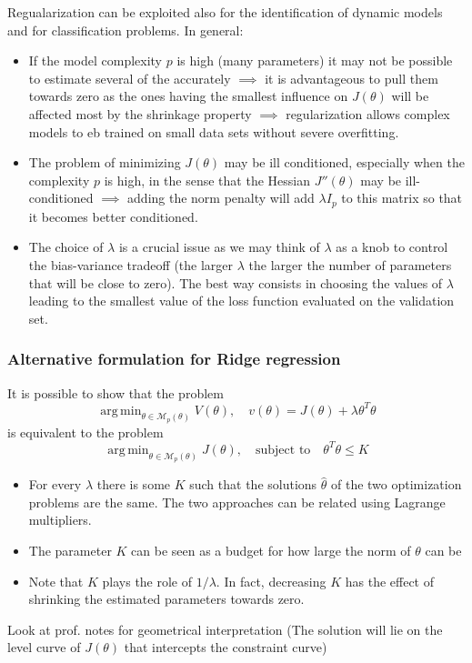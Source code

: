 \documentclass{book}
\DeclareMathOperator*{\argmin}{arg\,min}
\begin{document}
Regualarization can be exploited also for the identification of dynamic models and for classification problems. In general: 
\begin{itemize}
    \item If the model complexity $p$ is high (many parameters) it may not be possible to estimate several of the accurately $\implies$ it is advantageous to pull them towards zero as the ones having the smallest influence on $J(\theta)$ will be affected most by the shrinkage property $\implies$ regularization allows complex models to eb trained on small data sets without severe overfitting. 
    \item The problem of minimizing $J(\theta)$ may be ill conditioned, especially when the complexity $p$ is high, in the sense that the Hessian $J''(\theta)$ may be ill-conditioned $\implies$ adding the norm penalty will add $\lambda I_p$ to this matrix so that it becomes better conditioned. 
    \item The choice of $\lambda$ is a crucial issue as we may think of $\lambda$ as a knob to control the bias-variance tradeoff (the larger $\lambda$ the larger the number of parameters that will be close to zero). The best way consists in choosing the values of $\lambda$ leading to the smallest value of the loss function evaluated on the validation set. 
\end{itemize}

\subsubsection{Alternative formulation for Ridge regression}
It is possible to show that the problem 
\[
    \argmin_{\theta\in\mathcal{M}_p(\theta)}V(\theta),\quad v(\theta)=J(\theta) + \lambda\theta^T\theta
\]
is equivalent to the problem 
\[
    \argmin_{\theta\in\mathcal{M}_p(\theta)}J(\theta), \quad \text{subject to}\quad \theta^T\theta\leq K
\]
\begin{itemize}
    \item For every $\lambda$ there is some $K$ such that the solutions $\hat{\theta}$ of the two optimization problems are the same. The two approaches can be related using Lagrange multipliers. 
    \item The parameter $K$ can be seen as a budget for how large the norm of $\theta$ can be 
    \item Note that $K$ plays the role of $1/\lambda$. In fact, decreasing $K$ has the effect of shrinking the estimated parameters towards zero.
\end{itemize}
Look at prof. notes for geometrical interpretation (The solution will lie on the level curve of $J(\theta)$ that intercepts the constraint curve)
\end{document}
